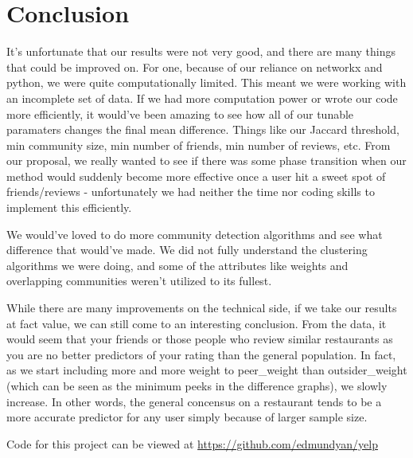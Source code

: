 \documentclass[10pt]{article}
\begin{document}
\section{Conclusion}
\label{sec:conclusion}

It's unfortunate that our results were not very good, and there are many things that could be improved on.  For one, because of our reliance on networkx and python, we were quite computationally limited.  This meant we were working with an incomplete set of data.  If we had more computation power or wrote our code more efficiently, it would've been amazing to see how all of our tunable paramaters changes the final mean difference.  Things like our Jaccard threshold, min community size, min number of friends, min number of reviews, etc.  From our proposal, we really wanted to see if there was some phase transition when our method would suddenly become more effective once a user hit a sweet spot of friends/reviews - unfortunately we had neither the time nor coding skills to implement this efficiently.

We would've loved to do more community detection algorithms and see what difference that would've made.  We did not fully understand the clustering algorithms we were doing, and some of the attributes like weights and overlapping communities weren't utilized to its fullest.

While there are many improvements on the technical side, if we take our results at fact value, we can still come to an interesting conclusion.  From the data, it would seem that your friends or those people who review similar restaurants as you are no better predictors of your rating than the general population.  In fact, as we start including more and more weight to peer\_weight than outsider\_weight (which can be seen as the minimum peeks in the difference graphs), we slowly increase.  In other words, the general concensus on a restaurant tends to be a more accurate predictor for any user simply because of larger sample size.


Code for this project can be viewed at \url{https://github.com/edmundyan/yelp}

\printbibliography
\end{document}
